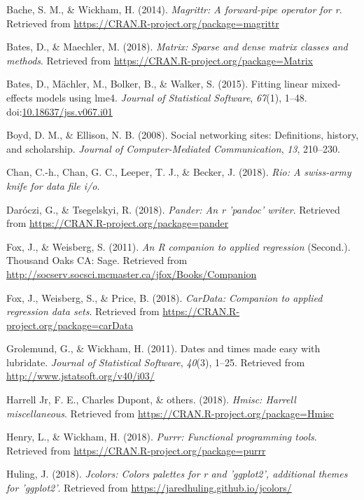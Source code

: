 \documentclass[man, fleqn, noextraspace]{apa6}
\theoremstyle{definition}
\theoremstyle{definition}
\theoremstyle{definition}
\theoremstyle{remark}
\begin{document}
\hypertarget{ref-R-magrittr}{}
Bache, S. M., \& Wickham, H. (2014). \emph{Magrittr: A forward-pipe
operator for r}. Retrieved from
\url{https://CRAN.R-project.org/package=magrittr}

\hypertarget{ref-R-Matrix}{}
Bates, D., \& Maechler, M. (2018). \emph{Matrix: Sparse and dense matrix
classes and methods}. Retrieved from
\url{https://CRAN.R-project.org/package=Matrix}

\hypertarget{ref-R-lme4}{}
Bates, D., Mächler, M., Bolker, B., \& Walker, S. (2015). Fitting linear
mixed-effects models using lme4. \emph{Journal of Statistical Software},
\emph{67}(1), 1--48.
doi:\href{https://doi.org/10.18637/jss.v067.i01}{10.18637/jss.v067.i01}

\hypertarget{ref-Boyd2008}{}
Boyd, D. M., \& Ellison, N. B. (2008). Social networking sites:
Definitions, history, and scholarship. \emph{Journal of
Computer-Mediated Communication}, \emph{13}, 210--230.

\hypertarget{ref-R-rio}{}
Chan, C.-h., Chan, G. C., Leeper, T. J., \& Becker, J. (2018).
\emph{Rio: A swiss-army knife for data file i/o}.

\hypertarget{ref-R-pander}{}
Daróczi, G., \& Tsegelskyi, R. (2018). \emph{Pander: An r 'pandoc'
writer}. Retrieved from \url{https://CRAN.R-project.org/package=pander}

\hypertarget{ref-R-car}{}
Fox, J., \& Weisberg, S. (2011). \emph{An R companion to applied
regression} (Second.). Thousand Oaks CA: Sage. Retrieved from
\url{http://socserv.socsci.mcmaster.ca/jfox/Books/Companion}

\hypertarget{ref-R-carData}{}
Fox, J., Weisberg, S., \& Price, B. (2018). \emph{CarData: Companion to
applied regression data sets}. Retrieved from
\url{https://CRAN.R-project.org/package=carData}

\hypertarget{ref-R-lubridate}{}
Grolemund, G., \& Wickham, H. (2011). Dates and times made easy with
lubridate. \emph{Journal of Statistical Software}, \emph{40}(3), 1--25.
Retrieved from \url{http://www.jstatsoft.org/v40/i03/}

\hypertarget{ref-R-Hmisc}{}
Harrell Jr, F. E., Charles Dupont, \& others. (2018). \emph{Hmisc:
Harrell miscellaneous}. Retrieved from
\url{https://CRAN.R-project.org/package=Hmisc}

\hypertarget{ref-R-purrr}{}
Henry, L., \& Wickham, H. (2018). \emph{Purrr: Functional programming
tools}. Retrieved from \url{https://CRAN.R-project.org/package=purrr}

\hypertarget{ref-R-jcolors}{}
Huling, J. (2018). \emph{Jcolors: Colors palettes for r and 'ggplot2',
additional themes for 'ggplot2'}. Retrieved from
\url{https://jaredhuling.github.io/jcolors/}
\end{document}
